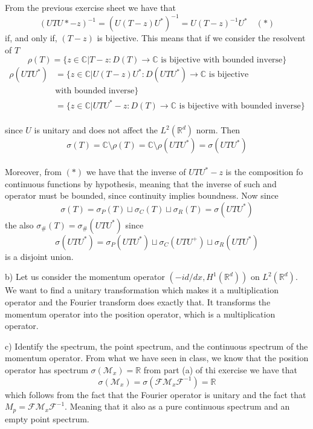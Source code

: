 \documentclass{article}
\newcommand{\R}{\mathbb{R}}
\newcommand{\C}{\mathbb{C}}
\newcommand{\M}{\mathcal{M}}
\newcommand{\F}{\mathcal{F}}
\begin{document}
From the previous exercise sheet we have that 
\[
    {(UTU* - z)}^{-1} = {(U(T-z)U^*)}^{-1} = U{(T-z)}^{-1} U^* \quad (*)
\]
if, and only if, $(T-z)$ is bijective. This means that if we consider the resolvent of $T$
\[
    \rho(T) = \{ z \in \C | T-z : D(T) \to \C \text{ is bijective with bounded inverse} \}
\]
\[
    \begin{split}
        \rho(UTU^*) &= \{ z \in \C | U(T-z)U^*  : D(UTU^*) \to \C 
        \text{ is bijective} \\
        & \text{with bounded inverse} \}\\
        &= \{ z \in \C | UTU^* -z  : D(T) \to \C \text{ is bijective with bounded inverse} \}
    \end{split}
\]\\
since $U$ is unitary and does not affect the $L^2(\R^d)$ norm. Then 
\[
    \sigma(T) = \C \setminus \rho(T)  = \C \setminus \rho({UTU^*}) = \sigma(UTU^*) 
\]\\
Moreover, from $(*)$ we have that the inverse of $UTU^* -z$ is the composition fo continuous functions by hypothesis, meaning that the inverse of such and operator must be bounded, since continuity implies boundness. Now since
\[
    \sigma (T) = \sigma_P(T) \sqcup  \sigma_C (T) \sqcup \sigma_R(T) = \sigma (UTU^*)
\]
the also $\sigma_{\#} (T) = \sigma_\# (UTU^*)$ since
\[
    \sigma (UTU^*)= \sigma_P(UTU^*) \sqcup  \sigma_C (UTU^+) \sqcup \sigma_R(UTU^*)
\]
is a disjoint union.

b) Let us consider the momentum operator $(-i d / dx, H^1(\R^d))$ on $L^2(\R^d)$. We want to find a unitary transformation which makes it a multiplication operator and the Fourier transform does exactly that. It transforms the momentum operator into the position operator, which is a multiplication operator.

c) Identify the spectrum, the point spectrum, and the continuous spectrum of
the momentum operator. From what we have seen in class, we know that the position operator has spectrum $\sigma(\M_x) = \R$ from part (a) of thi exercise we have that
\[
    \sigma(\M_x) = \sigma(\F \M_x \F^{-1}) = \R
\]
which follows from the fact that the Fourier operator is unitary and the fact that $M_p = \F \M_x \F^{-1}$. Meaning that it also as a pure continuous spectrum and an empty point spectrum. 
\end{document}
